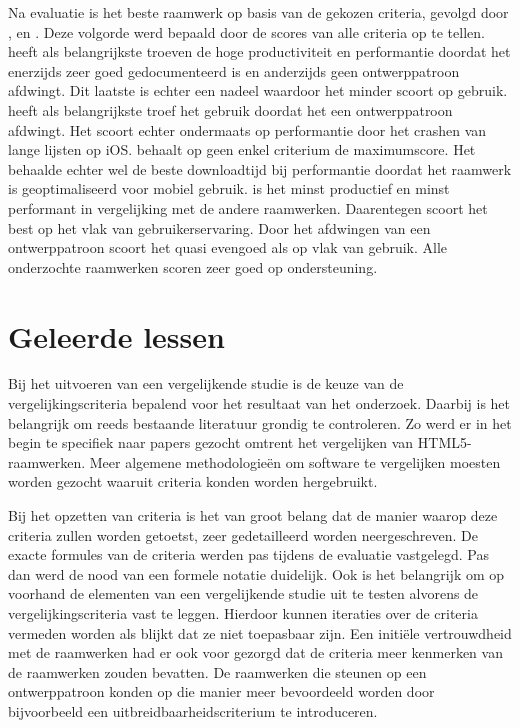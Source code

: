 Na evaluatie is \jqm{} het beste raamwerk op basis van de gekozen criteria, gevolgd door \kendo{}, \lungo{} en \st{}.
Deze volgorde werd bepaald door de scores van alle criteria op te tellen.
\jqm{} heeft als belangrijkste troeven de hoge productiviteit en performantie doordat het enerzijds zeer goed gedocumenteerd is en anderzijds geen ontwerppatroon afdwingt.
Dit laatste is echter een nadeel waardoor het minder scoort op gebruik.
\kendo{} heeft als belangrijkste troef het gebruik doordat het een ontwerppatroon afdwingt.
Het scoort echter ondermaats op performantie door het crashen van lange lijsten op iOS.
\lungo{} behaalt op geen enkel criterium de maximumscore.
Het behaalde echter wel de beste downloadtijd bij performantie doordat het raamwerk is geoptimaliseerd voor mobiel gebruik.
\st{} is het minst productief en minst performant in vergelijking met de andere raamwerken.
Daarentegen scoort \st{} het best op het vlak van gebruikerservaring.
Door het afdwingen van een ontwerppatroon scoort het quasi evengoed als \kendo{} op vlak van gebruik.
Alle onderzochte raamwerken scoren zeer goed op ondersteuning.


\section{Geleerde lessen} %
Bij het uitvoeren van een vergelijkende studie is de keuze van de vergelijkingscriteria bepalend voor het resultaat van het onderzoek.
Daarbij is het belangrijk om reeds bestaande literatuur grondig te controleren.
Zo werd er in het begin te specifiek naar papers gezocht omtrent het vergelijken van HTML5-raamwerken.
Meer algemene methodologieën om software te vergelijken moesten worden gezocht waaruit criteria konden worden hergebruikt.

Bij het opzetten van criteria is het van groot belang dat de manier waarop deze criteria zullen worden getoetst, zeer gedetailleerd worden neergeschreven.
De exacte formules van de criteria werden pas tijdens de evaluatie vastgelegd.
Pas dan werd de nood van een formele notatie duidelijk.
Ook is het belangrijk om op voorhand de elementen van een vergelijkende studie uit te testen alvorens de vergelijkingscriteria vast te leggen.
Hierdoor kunnen iteraties over de criteria vermeden worden als blijkt dat ze niet toepasbaar zijn.
Een initiële vertrouwdheid met de raamwerken had er ook voor gezorgd dat de criteria meer kenmerken van de raamwerken zouden bevatten.
De raamwerken die steunen op een ontwerppatroon konden op die manier meer bevoordeeld worden door bijvoorbeeld een uitbreidbaarheidscriterium te introduceren.

